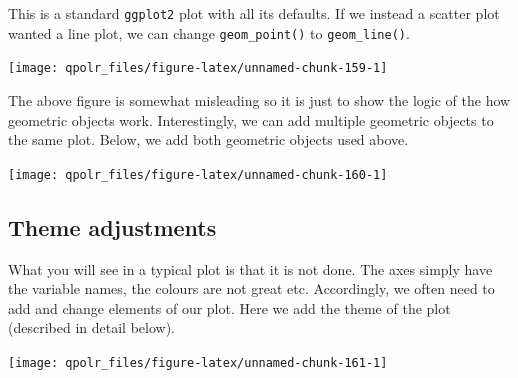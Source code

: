 \documentclass[12pt,oneside]{reedthesis}
\theoremstyle{definition}
\theoremstyle{definition}
\theoremstyle{definition}
\theoremstyle{remark}
\begin{document}
  This is a standard \texttt{ggplot2} plot with all its defaults. If we
  instead a scatter plot wanted a line plot, we can change
  \texttt{geom\_point()} to \texttt{geom\_line()}.
  \begin{Shaded}
  \begin{Highlighting}[]
  \NormalTok{(}\OperatorTok{+}
  \StringTok{  }\NormalTok{()}
  \end{Highlighting}
  \end{Shaded}
  \begin{center}\texttt{[image: qpolr\_files/figure-latex/unnamed-chunk-159-1]} \end{center}
  
  The above figure is somewhat misleading so it is just to show the logic
  of the how geometric objects work. Interestingly, we can add multiple
  geometric objects to the same plot. Below, we add both geometric objects
  used above.
  \begin{Shaded}
  \begin{Highlighting}[]
  \NormalTok{(}\OperatorTok{+}
  \StringTok{  }\NormalTok{() }\OperatorTok{+}
  \StringTok{  }\NormalTok{()}
  \end{Highlighting}
  \end{Shaded}
  \begin{center}\texttt{[image: qpolr\_files/figure-latex/unnamed-chunk-160-1]} \end{center}
  
  \subsection{Theme adjustments}\label{theme-adjustments}
  
  What you will see in a typical plot is that it is not done. The axes
  simply have the variable names, the colours are not great etc.
  Accordingly, we often need to add and change elements of our plot. Here
  we add the theme of the plot (described in detail below).
  \begin{Shaded}
  \begin{Highlighting}[]
  \NormalTok{(}\OperatorTok{+}
  \StringTok{  }\NormalTok{() }\OperatorTok{+}
  \StringTok{  }\NormalTok{()}
  \end{Highlighting}
  \end{Shaded}
  \begin{center}\texttt{[image: qpolr\_files/figure-latex/unnamed-chunk-161-1]} \end{center}
  
\end{document}
